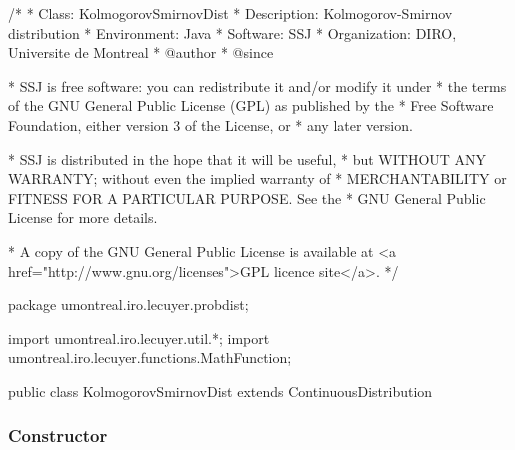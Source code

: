 \begin{code}
\begin{hide}
/*
 * Class:        KolmogorovSmirnovDist
 * Description:  Kolmogorov-Smirnov distribution
 * Environment:  Java
 * Software:     SSJ
 * Organization: DIRO, Universite de Montreal
 * @author
 * @since

 * SSJ is free software: you can redistribute it and/or modify it under
 * the terms of the GNU General Public License (GPL) as published by the
 * Free Software Foundation, either version 3 of the License, or
 * any later version.

 * SSJ is distributed in the hope that it will be useful,
 * but WITHOUT ANY WARRANTY; without even the implied warranty of
 * MERCHANTABILITY or FITNESS FOR A PARTICULAR PURPOSE.  See the
 * GNU General Public License for more details.

 * A copy of the GNU General Public License is available at
   <a href="http://www.gnu.org/licenses">GPL licence site</a>.
 */
\end{hide}
package umontreal.iro.lecuyer.probdist;
\begin{hide}
import umontreal.iro.lecuyer.util.*;
import umontreal.iro.lecuyer.functions.MathFunction;
\end{hide}

public class KolmogorovSmirnovDist extends ContinuousDistribution\begin{hide} {
   protected int n;
   protected static final int NEXACT = 500;

   // For the Durbin matrix algorithm
   private static final double NORM = 1.0e140;
   private static final double INORM = 1.0e-140;
   private static final int LOGNORM = 140;



   //========================================================================

   private static class Function implements MathFunction {
      protected int n;
      protected double u;

      public Function (int n, double u) {
         this.n = n;
         this.u = u;
      }

      public double evaluate (double x) {
         return u - cdf(n,x);
      }
   }
\end{hide}
\end{code}
\subsubsection* {Constructor}

